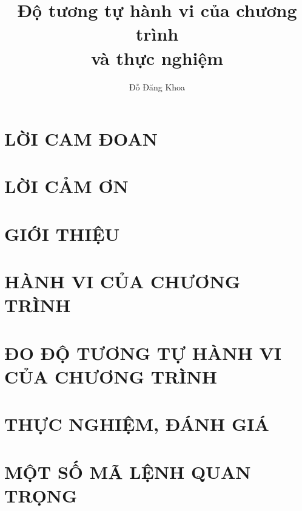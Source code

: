 \documentclass[12pt,a4paper,openany,oneside]{memoir} %
\title{Độ tương tự hành vi của chương trình \\ và thực nghiệm}
\author{Đỗ Đăng Khoa}
\begin{document}
	
\fontsize{14pt}{14pt}\selectfont \baselineskip 0.65cm
\thispagestyle{empty}



\chapter*{LỜI CAM ĐOAN}


\chapter*{LỜI CẢM ƠN}


\newpage
\tableofcontents


\newpage

\listoffigures
\newpage

\lstlistoflistings


\chapter{GIỚI THIỆU}
\label{chap:intro}


\chapter{HÀNH VI CỦA CHƯƠNG TRÌNH}
\label{chap:behaviors}


\chapter{ĐO ĐỘ TƯƠNG TỰ HÀNH VI CỦA CHƯƠNG TRÌNH}
\label{chap:method}


\chapter{THỰC NGHIỆM, ĐÁNH GIÁ}
\label{chap:results}





\appendix



\chapter{MỘT SỐ MÃ LỆNH QUAN TRỌNG}

\end{document}
